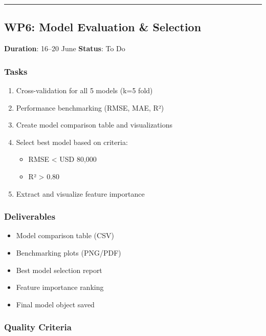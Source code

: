 \documentclass[
  english,
  letterpaper,
  DIV=11,
  numbers=noendperiod]{scrreprt}
\providecommand{\tightlist}{%
  \setlength{\itemsep}{0pt}\setlength{\parskip}{0pt}}
\begin{document}
\begin{center}\rule{0.5\linewidth}{0.5pt}\end{center}

\subsection{WP6: Model Evaluation \&
Selection}\label{wp6-model-evaluation-selection}

\textbf{Duration}: 16--20 June \textbar{} \textbf{Status}: To Do

\subsubsection{Tasks}\label{tasks-4}

\begin{enumerate}
\def\labelenumi{\arabic{enumi}.}
\tightlist
\item
  Cross-validation for all 5 models (k=5 fold)
\item
  Performance benchmarking (RMSE, MAE, R²)
\item
  Create model comparison table and visualizations
\item
  Select best model based on criteria:

  \begin{itemize}
  \tightlist
  \item
    RMSE \textless{} USD 80,000
  \item
    R² \textgreater{} 0.80
  \end{itemize}
\item
  Extract and visualize feature importance
\end{enumerate}

\subsubsection{Deliverables}\label{deliverables-6}

\begin{itemize}
\tightlist
\item
  Model comparison table (CSV)
\item
  Benchmarking plots (PNG/PDF)
\item
  Best model selection report
\item
  Feature importance ranking
\item
  Final model object saved
\end{itemize}

\subsubsection{Quality Criteria}\label{quality-criteria-5}
\end{document}
